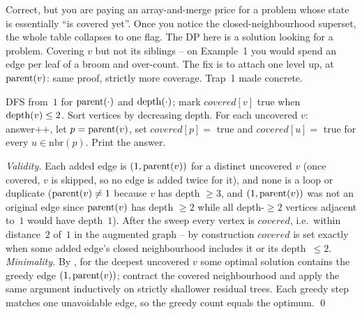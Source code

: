 \begin{thinkbox}
{Correct, but you are paying an array-and-merge price for a problem whose state is
essentially ``is covered yet''. Once you notice the closed-neighbourhood superset, the
whole table collapses to one flag. The DP here is a solution looking for a problem.}
{Covering $v$ but not its siblings -- on Example~1 you would spend an edge per leaf of
a broom and over-count. The fix is to attach one level up, at $\operatorname{parent}(v)$: same proof,
strictly more coverage. Trap~1 made concrete.}
\end{thinkbox}

DFS from~$1$ for $\operatorname{parent}(\cdot)$ and $\operatorname{depth}(\cdot)$; mark $\mathit{covered}[v]$ true when
$\operatorname{depth}(v) \le 2$. Sort vertices by decreasing depth. For each uncovered $v$: answer++,
let $p = \operatorname{parent}(v)$, set $\mathit{covered}[p] = $ true and $\mathit{covered}[u] = $ true for every
$u \in \mathrm{nbr}(p)$. Print the answer.

\begin{proofbox}
\emph{Validity.} Each added edge is $(1,\operatorname{parent}(v))$ for a distinct uncovered $v$ (once
covered, $v$ is skipped, so no edge is added twice for it), and none is a loop or
duplicate ($\operatorname{parent}(v) \ne 1$ because $v$ has depth $\ge 3$, and $(1,\operatorname{parent}(v))$ was not
an original edge since $\operatorname{parent}(v)$ has depth $\ge 2$ while all depth-$\ge2$ vertices
adjacent to~$1$ would have depth~$1$). After the sweep every vertex is $\mathit{covered}$, i.e.\
within distance~$2$ of~$1$ in the augmented graph -- by construction $\mathit{covered}$ is set
exactly when some added edge's closed neighbourhood includes it or its depth~$\le2$.
\emph{Minimality.} By \thmref{c27-exchange}, for the deepest uncovered $v$ some optimal
solution contains the greedy edge $(1,\operatorname{parent}(v))$; contract the covered neighbourhood and
apply the same argument inductively on strictly shallower residual trees. Each greedy step
matches one unavoidable edge, so the greedy count equals the optimum. \qed
\end{proofbox}

